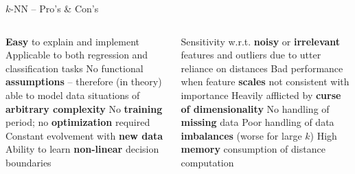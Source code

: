 
\begin{frame}{$k$-NN -- Pro's \& Con's}

\footnotesize

\begin{columns}[onlytextwidth]
  \begin{column}{0.5\textwidth}
    \footnotesize
    \begin{itemize}
      \positem \textbf{Easy} to explain and implement
      \positem Applicable to both regression and classification tasks
      \positem No functional \textbf{assumptions} -- therefore (in theory) able 
      to model data situations of \textbf{arbitrary complexity}
      \positem No \textbf{training} period; no \textbf{optimization} required 
      \positem Constant evolvement with \textbf{new data}
      \positem Ability to learn \textbf{non-linear} decision boundaries
    \end{itemize}
  \end{column}
  \begin{column}{0.5\textwidth}
    \footnotesize
    \begin{itemize}
      \negitem Sensitivity w.r.t. \textbf{noisy} or \textbf{irrelevant} features
      and outliers due to utter reliance on distances
      \negitem Bad performance when feature \textbf{scales} not consistent 
      with importance
      \negitem Heavily afflicted by \textbf{curse of dimensionality}
      \negitem No handling of \textbf{missing} data
      \negitem Poor handling of data \textbf{imbalances} (worse for large $k$)
      \negitem High \textbf{memory} consumption of distance computation
    \end{itemize}
  \end{column}
\end{columns}

\vfill

\small


\end{frame}


